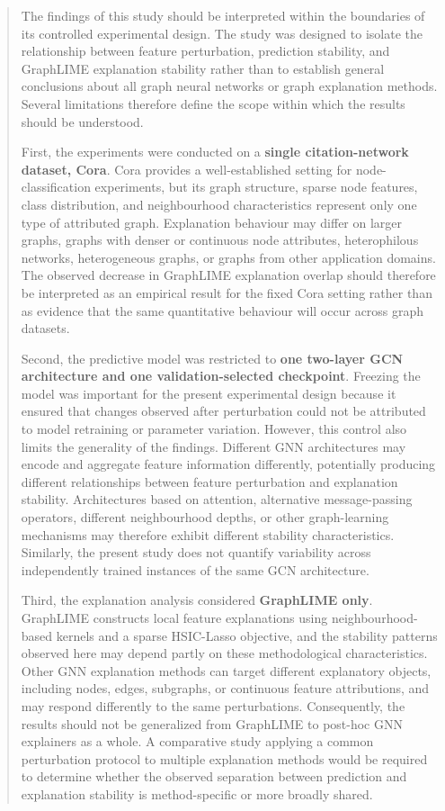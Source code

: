 \documentclass[a4paper]{article}
\begin{document}
\begin{quote}
The findings of this study should be interpreted within the boundaries
of its controlled experimental design. The study was designed to isolate
the relationship between feature perturbation, prediction stability, and
GraphLIME explanation stability rather than to establish general
conclusions about all graph neural networks or graph explanation
methods. Several limitations therefore define the scope within which the
results should be understood.

First, the experiments were conducted on a \textbf{single
citation-network dataset, Cora}. Cora provides a well-established
setting for node-classification experiments, but its graph structure,
sparse node features, class distribution, and neighbourhood
characteristics represent only one type of attributed graph. Explanation
behaviour may differ on larger graphs, graphs with denser or continuous
node attributes, heterophilous networks, heterogeneous graphs, or graphs
from other application domains. The observed decrease in GraphLIME
explanation overlap should therefore be interpreted as an empirical
result for the fixed Cora setting rather than as evidence that the same
quantitative behaviour will occur across graph datasets.

Second, the predictive model was restricted to \textbf{one two-layer GCN
architecture and one validation-selected checkpoint}. Freezing the model
was important for the present experimental design because it ensured
that changes observed after perturbation could not be attributed to
model retraining or parameter variation. However, this control also
limits the generality of the findings. Different GNN architectures may
encode and aggregate feature information differently, potentially
producing different relationships between feature perturbation and
explanation stability. Architectures based on attention, alternative
message-passing operators, different neighbourhood depths, or other
graph-learning mechanisms may therefore exhibit different stability
characteristics. Similarly, the present study does not quantify
variability across independently trained instances of the same GCN
architecture.

Third, the explanation analysis considered \textbf{GraphLIME only}.
GraphLIME constructs local feature explanations using
neighbourhood-based kernels and a sparse HSIC-Lasso objective, and the
stability patterns observed here may depend partly on these
methodological characteristics. Other GNN explanation methods can target
different explanatory objects, including nodes, edges, subgraphs, or
continuous feature attributions, and may respond differently to the same
perturbations. Consequently, the results should not be generalized from
GraphLIME to post-hoc GNN explainers as a whole. A comparative study
applying a common perturbation protocol to multiple explanation methods
would be required to determine whether the observed separation between
prediction and explanation stability is method-specific or more broadly
shared.


\end{quote}
\end{document}
